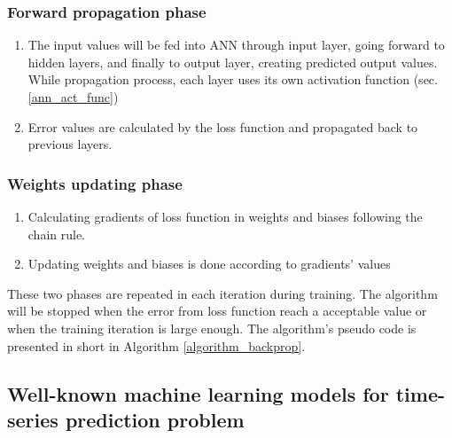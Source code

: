 \documentclass[../main.tex]{subfiles}
\begin{document}
\subsubsection{Forward propagation phase}
\begin{enumerate}
\item The input values will be fed into ANN through input layer, going forward to hidden layers, and finally to output layer, creating predicted output values. While propagation process, each layer uses its own activation function (sec. \ref{ann_act_func})
\item Error values are calculated by the loss function and propagated back to previous layers.
\end{enumerate}
\subsubsection{Weights updating phase}

\begin{enumerate}
\item Calculating gradients of loss function in weights and biases following the chain rule.
\item Updating weights and biases is done according to gradients' values 
\end{enumerate}

These two phases are repeated in each iteration during training. The algorithm will be stopped when the error from loss function reach a acceptable value or when the training iteration is large enough. The algorithm's pseudo code is presented in short in Algorithm \ref{algorithm_backprop}.

\subsection{Well-known machine learning models for time-series prediction problem}
\label{wl_known_models}
\end{document}
